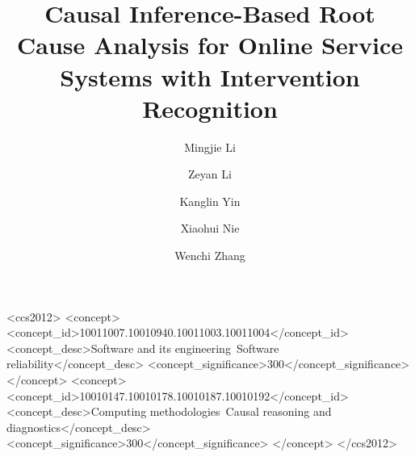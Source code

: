 \documentclass[sigconf]{acmart}
\theoremstyle{remark}
\begin{document}
\begin{CCSXML}
	<ccs2012>
	<concept>
	<concept_id>10011007.10010940.10011003.10011004</concept_id>
	<concept_desc>Software and its engineering~Software reliability</concept_desc>
	<concept_significance>300</concept_significance>
	</concept>
	<concept>
	<concept_id>10010147.10010178.10010187.10010192</concept_id>
	<concept_desc>Computing methodologies~Causal reasoning and diagnostics</concept_desc>
	<concept_significance>300</concept_significance>
	</concept>
	</ccs2012>
\end{CCSXML}




\title{Causal Inference-Based Root Cause Analysis for Online Service Systems with Intervention Recognition}

\author{Mingjie Li}

\author{Zeyan Li}

\author{Kanglin Yin}

\author{Xiaohui Nie}

\author{Wenchi Zhang}
\end{document}
